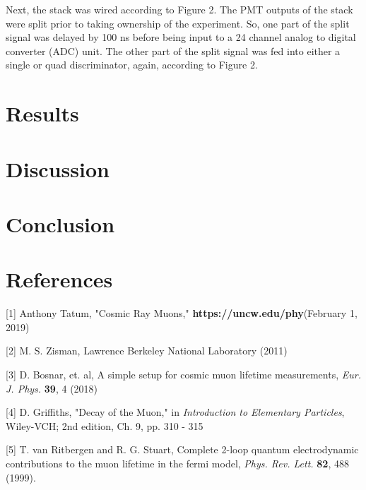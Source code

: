 \documentclass{article}
\begin{document}
Next, the stack was wired according to Figure 2. The PMT outputs of the stack were split prior to taking ownership of the experiment. So, one part of the split signal was delayed by 100 ns before being input to a 24 channel analog to digital converter (ADC) unit. The other part of the split signal was fed into either a single or quad discriminator, again, according to Figure 2. 



\section*{Results}

\section*{Discussion}

\section*{Conclusion}

\section*{References}

\hspace{4mm} [1] \hspace{1mm}  Anthony Tatum, "Cosmic Ray Muons," \textbf{https://uncw.edu/phy}\newline (February 1, 2019)

\vspace{3mm}

[2] \hspace{1mm} M. S. Zisman, Lawrence Berkeley National Laboratory (2011)

\vspace{3 mm}



[3] \hspace{1mm}  D. Bosnar, et. al, A simple setup for cosmic muon lifetime measurements, \textit{Eur. J. Phys.} \textbf{39}, 4 (2018)
\vspace{3 mm}

[4] \hspace{1mm} D. Griffiths, "Decay of the Muon," in \textit{Introduction to Elementary Particles}, Wiley-VCH; 2nd edition, Ch. 9, pp. 310 - 315

\vspace{3 mm}

[5] \hspace{1mm} T. van Ritbergen and R. G. Stuart, Complete 2-loop quantum electrodynamic contributions to the muon lifetime in the fermi model, \textit{Phys. Rev. Lett.} \textbf{82}, 488 (1999).
\end{document}
